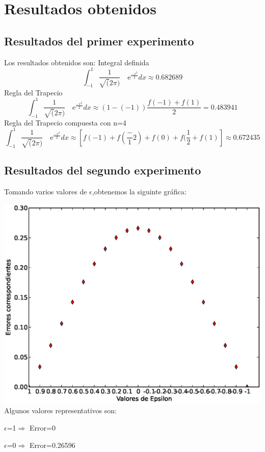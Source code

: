 \section{Resultados obtenidos}
\label{3:sec:3}

\subsection{Resultados del primer experimento}
Los resultados obtenidos son:
Integral definida 
\[
\int_{-1}^{1} \frac{1}{\sqrt(2\pi)} \quad\text{e}^{\frac{-x^2}{2}}dx\approx0.682689 
\]
Regla del Trapecio
\[
\int_{-1}^{1} \frac{1}{\sqrt(2\pi)} \quad\text{e}^{\frac{-x^2}{2}}dx\approx\left(1-(-1)\right)\frac{f(-1)+f(1)}{2}=0.483941
\]
Regla del Trapecio compuesta con n=4
\[
\int_{-1}^{1} \frac{1}{\sqrt(2\pi)} \quad\text{e}^{\frac{-x^2}{2}}dx\approx\left[f(-1) + f(\frac-{1}{2}) + f(0) + f(\frac{1}{2} + f(1)\right]\approx0.672435
\]
\subsection{Resultados del segundo experimento}
Tomando varios valores de $\epsilon$,obtenemos la siguinte gráfica:








\includegraphics[width=1\textwidth]{images/imgraf}
Algunos valores representativos son:

$\epsilon$=1$\Rightarrow$ Error=0

$\epsilon$=0$\Rightarrow$ Error=0.26596

